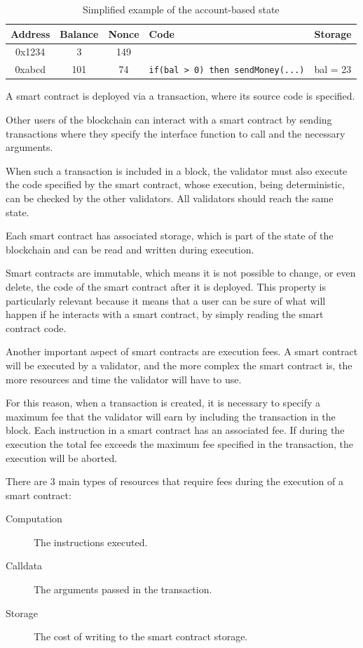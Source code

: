 \documentclass[11pt]{article}
\begin{document}
\begin{table}[h]
    \centering
    \begin{tabular}{|c|c|c|l|l|}
        \hline
        \textbf{Address} & \textbf{Balance} & \textbf{Nonce} & \textbf{Code} & \textbf{Storage} \\
        \hline
        0x1234 & 3 & 149 & & \\        
        0xabcd & 101 & 74 & \verb|if(bal > 0) then sendMoney(...)| & bal = 23 \\
        \hline       
    \end{tabular}
    \caption{Simplified example of the account-based state}
    \label{table:account_based_state}
\end{table}

A smart contract is deployed via a transaction, where its source code is specified.

Other users of the blockchain can interact with a smart contract by sending transactions where they specify the interface function to call and the necessary arguments.

When such a transaction is included in a block, the validator must also execute the code specified by the smart contract, whose execution, being deterministic, can be checked by the other validators. All validators should reach the same state.

Each smart contract has associated storage, which is part of the state of the blockchain and can be read and written during execution.

Smart contracts are immutable, which means it is not possible to change, or even delete, the code of the smart contract after it is deployed. 
This property is particularly relevant because it means that a user can be sure of what will happen if he interacts with a smart contract, by simply reading the smart contract code.

Another important aspect of smart contracts are execution fees. A smart contract will be executed by a validator, and the more complex the smart contract is, the more resources and time the validator will have to use.

For this reason, when a transaction is created, it is necessary to specify a maximum fee that the validator will earn by including the transaction in the block.
Each instruction in a smart contract has an associated fee. If during the execution the total fee exceeds the maximum fee specified in the transaction, the execution will be aborted.

There are 3 main types of resources that require fees during the execution of a smart contract:
\begin{description}
    \item[Computation] The instructions executed.
    \item[Calldata] The arguments passed in the transaction.
    \item[Storage] The cost of writing to the smart contract storage.  
\end{description}
\end{document}
